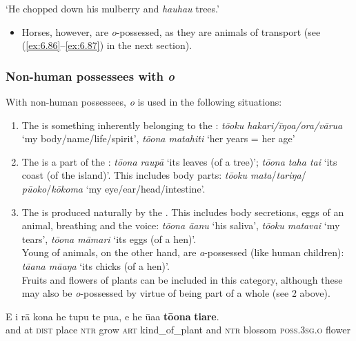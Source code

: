 \glt
‘He chopped down his mulberry and \textit{hauhau} trees.’ \textstyleExampleref{[R352.030]} 
\z
\begin{itemize}
\item[]
Horses, however, are \textit{o}{}-possessed, as they are animals of transport (see (\ref{ex:6.86}–\ref{ex:6.87}) in the next section).
\end{itemize}

\subsubsection[Non{}-human possessees with o]{Non-human possessees with \textit{o}}\label{sec:6.3.3.3}

With non-human possessees, \textit{o} is used in the following situations:

\begin{enumerate}
\item 
The  is something inherently belonging to the : \textit{tō{\ꞌ}oku hakari/{\ꞌ}īŋoa/ora/vārua} ‘my body/name/life/spirit’, \textit{tō{\ꞌ}ona matahiti} ‘her years = her age’

\item 
The  is a part of the : \textit{tō{\ꞌ}ona raupā} ‘its leaves (of a tree)’; \textit{tō{\ꞌ}ona taha tai} ‘its coast (of the island)’. This includes body parts: \textit{tō{\ꞌ}oku mata}/\textit{tariŋa}/ \mbox{\textit{pū{\ꞌ}oko}}/\textit{kōkoma} ‘my eye/ear/head/intestine’.

\item 
The  is produced naturally by the . This includes body secretions, eggs of an animal, breathing and the voice: \textit{tō{\ꞌ}ona {\ꞌ}ā{\ꞌ}anu} ‘his saliva’, \textit{tō{\ꞌ}oku matavai} ‘my tears’, \textit{tō{\ꞌ}ona māmari} ‘its eggs (of a hen)’.\\
Young of animals, on the other hand, are \textit{a}{}-possessed (like human children): \textit{\mbox{tā{\ꞌ}ana} mā{\ꞌ}aŋa} ‘its chicks (of a hen)’.\\
Fruits and flowers of plants can be included in this category, although these may also be \textit{o}\nobreakdash-possessed by virtue of being part of a whole (see 2 above).

\end{enumerate}

\ea\label{ex:6.81}
\gll {\ꞌ}E {\ꞌ}i rā kona he tupu te pua, {\ꞌ}e he {\ꞌ}ūa{\ꞌ}a \textbf{tō{\ꞌ}ona} \textbf{tiare}. \\
and at \textsc{dist} place \textsc{ntr} grow \textsc{art} kind\_of\_plant and \textsc{ntr} blossom \textsc{poss.3sg.o} flower \\

